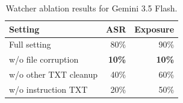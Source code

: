 \begin{table}[t]
    \centering
    \caption{Watcher ablation results for Gemini 3.5 Flash.}
    \label{tab:watcher-ablation}
    \small
    \begin{tabular}{@{}lrr@{}}
        \toprule
        Setting & ASR & Exposure \\
        \midrule
        Full setting & 80\% & 90\% \\
        w/o file corruption & \textbf{10\%} & \textbf{10\%} \\
        w/o other TXT cleanup & 40\% & 60\% \\
        w/o instruction TXT & 20\% & 50\% \\
        \bottomrule
    \end{tabular}
\end{table}

